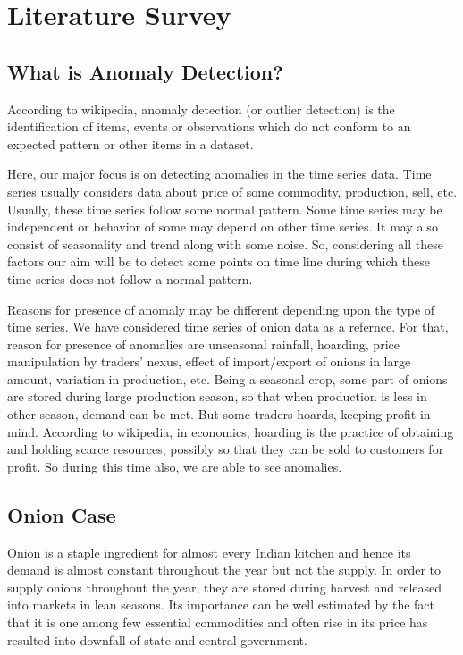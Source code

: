 \chapter{Literature Survey}


\section{What is Anomaly Detection?}

According to wikipedia, anomaly detection (or outlier detection) is the identification of items, events or observations which do not conform to an expected pattern or other items in a dataset.

Here, our major focus is on detecting anomalies in the time series data. Time series usually considers data about price of some commodity, production, sell, etc. Usually, these time series follow some normal pattern. Some time series may be independent or behavior of some may depend on other time series. It may also consist of seasonality and trend along with some noise. So, considering all these factors our aim will be to detect some points on time line during which these time series does not follow a normal pattern.

Reasons for presence of anomaly may be different depending upon the type of time series. We have considered time series of onion data as a refernce. For that, reason for presence of anomalies are unseasonal rainfall, hoarding, price manipulation by traders' nexus, effect of import/export of onions in large amount, variation in production, etc. Being a seasonal crop, some part of onions are stored during large production season, so that when production is less in other season, demand can be met. But some traders hoards, keeping profit in mind. According to wikipedia, in economics, hoarding is the practice of obtaining and holding scarce resources, possibly so that they can be sold to customers for profit. So during this time also, we are able to see anomalies.


\section{Onion Case}


Onion is a staple ingredient for almost every Indian kitchen and hence its demand is almost constant throughout the year but not the supply. In order to supply onions throughout the year, they are stored during harvest and released into markets in lean seasons. Its importance can be well estimated by the fact that it is one among few essential commodities and often rise in its price has resulted into downfall of state and central government.


